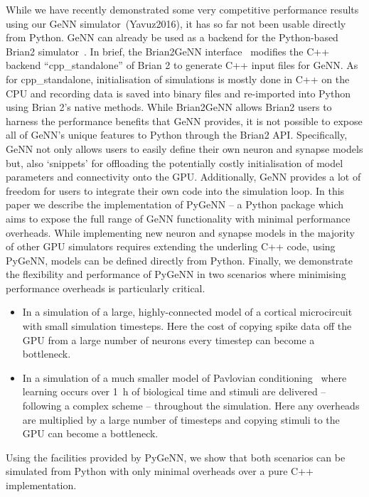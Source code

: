 \documentclass[utf8]{frontiersSCNS} %
\begin{document}
While we have recently demonstrated some very competitive performance results~\citep{Knight2018,Knight2020} using our GeNN simulator~(Yavuz2016), it has so far not been usable directly from Python.
GeNN can already be used as a backend for the Python-based Brian2 simulator~\citep{Stimberg2019}. In brief, the Brian2GeNN interface~\citep{Stimberg2020} modifies the C++ backend ``cpp\_standalone'' of Brian 2 to generate C++ input files for GeNN. As for cpp\_standalone, initialisation of simulations is mostly done in C++ on the CPU and recording data is saved into binary files and re-imported into Python using Brian 2's native methods. While Brian2GeNN allows Brian2 users to harness the performance benefits that GeNN provides, it is not possible to expose all of GeNN's unique features to Python through the Brian2 API.
Specifically, GeNN not only allows users to easily define their own neuron and synapse models but, also `snippets' for offloading the potentially costly initialisation of model parameters and connectivity onto the GPU.
Additionally, GeNN  provides a lot of freedom for users to integrate their own code into the simulation loop.
In this paper we describe the implementation of PyGeNN -- a Python package which aims to expose the full range of GeNN functionality with minimal performance overheads.
While implementing new neuron and synapse models in the majority of other GPU simulators requires extending the underling C++ code, using PyGeNN, models can be defined directly from Python.
Finally, we demonstrate the flexibility and performance of PyGeNN in two scenarios where minimising performance overheads is particularly critical.
\begin{itemize}
    \item In a simulation of a large, highly-connected model of a cortical microcircuit~\citep{Potjans2012} with small simulation timesteps. Here the cost of copying spike data off the GPU from a large number of neurons every timestep can become a bottleneck.
    \item In a simulation of a much smaller model of Pavlovian conditioning~\citep{Izhikevich2007} where learning occurs over \SI{1}{\hour} of biological time and stimuli are delivered -- following a complex scheme -- throughout the simulation. Here any overheads are multiplied by a large number of timesteps and copying stimuli to the GPU can become a bottleneck.
\end{itemize}
Using the facilities provided by PyGeNN, we show that both scenarios can be simulated from Python with only minimal overheads over a pure C++ implementation.
\end{document}
